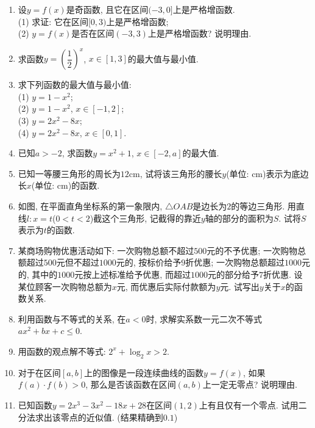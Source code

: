 \documentclass[10pt,a4paper]{article}
\begin{document}
\begin{enumerate}[1.]
\item 设$y=f(x)$是奇函数, 且它在区间$(-3, 0]$上是严格增函数.\\
(1) 求证: 它在区间$[0, 3)$上是严格增函数;\\
(2) $y=f(x)$是否在区间$(-3, 3)$上是严格增函数? 说明理由.
\item 求函数$y=(\dfrac 12)^x$, $x\in [1, 3]$的最大值与最小值.
\item 求下列函数的最大值与最小值:\\
(1) $y=1-x^2$;\\
(2) $y=1-x^2$, $x\in [-1, 2]$;\\
(3) $y=2x^2-8x$;\\
(4) $y=2x^2-8x$, $x\in [0, 1]$.
\item 已知$a>-2$, 求函数$y=x^2+1$, $x\in [-2, a]$的最大值.
\item 已知一等腰三角形的周长为$12\text{cm}$, 试将该三角形的腰长$y$(单位: $\text{cm}$)表示为底边长$x$(单位: $\text{cm}$)的函数.
\item 如图, 在平面直角坐标系的第一象限内, $\triangle OAB$是边长为$2$的等边三角形. 用直线$l: x=t$($0<t<2$)截这个三角形, 记截得的靠近$y$轴的部分的面积为$S$. 试将$S$表示为$t$的函数.
\begin{center}
\end{center}
\item 某商场购物优惠活动如下: 一次购物总额不超过$500$元的不予优惠; 一次购物总额超过$500$元但不超过$1000$元的, 按标价给予$9$折优惠; 一次购物总额超过$1000$元的, 其中的$1000$元按上述标准给予优惠, 而超过$1000$元的部分给予$7$折优惠. 设某位顾客一次购物总额为$x$元, 而优惠后实际付款额为$y$元. 试写出$y$关于$x$的函数关系.
\item 利用函数与不等式的关系, 在$a<0$时, 求解实系数一元二次不等式$ax^2+bx+c\le 0$.
\item 用函数的观点解不等式: $2^x+\log_2x>2$.
\item 对于在区间$[a, b]$上的图像是一段连续曲线的函数$y=f(x)$, 如果$f(a)\cdot f(b)>0$, 那么是否该函数在区间$(a, b)$上一定无零点? 说明理由.
\item 已知函数$y=2x^3-3x^2-18x+28$在区间$(1, 2)$上有且仅有一个零点. 试用二分法求出该零点的近似值. (结果精确到$0.1$)

\end{enumerate}
\end{document}
